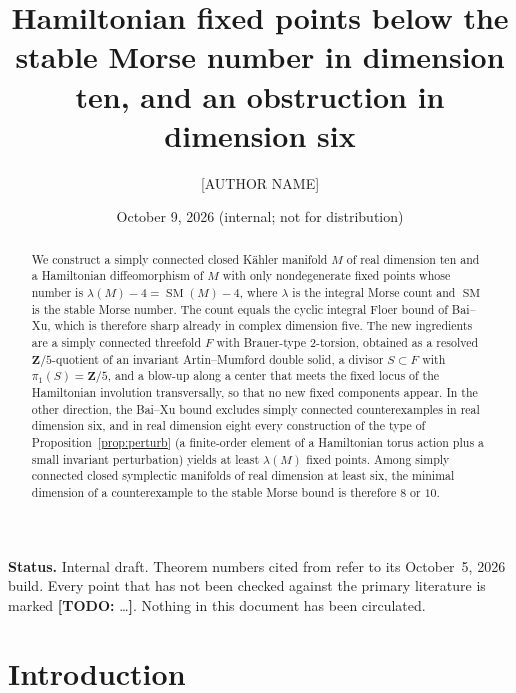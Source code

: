 \documentclass[11pt]{amsart}
\title[Fixed points below the stable Morse number in dimension ten]{Hamiltonian fixed points below the stable Morse number in dimension ten, and an obstruction in dimension six}
\author{[AUTHOR NAME]}
\date{October 9, 2026 (internal; not for distribution)}
\newcommand{\todo}[1]{{\color{red}\textbf{[TODO:} #1\textbf{]}}}
\numberwithin{equation}{section}
\theoremstyle{definition}
\theoremstyle{remark}
\newcommand{\Z}{\mathbf Z}
\DeclareMathOperator{\SM}{SM}
\begin{document}
\begin{abstract}
We construct a simply connected closed K\"ahler manifold $M$ of real
dimension ten and a Hamiltonian diffeomorphism of $M$ with only
nondegenerate fixed points whose number is $\lambda(M)-4=\SM(M)-4$, where
$\lambda$ is the integral Morse count and $\SM$ is the stable Morse number.
The count equals the cyclic integral Floer bound of Bai--Xu, which is
therefore sharp already in complex dimension five. The new ingredients are
a simply connected threefold $F$ with Brauer-type $2$-torsion, obtained as a
resolved $\Z/5$-quotient of an invariant Artin--Mumford double solid, a
divisor $S\subset F$ with $\pi_1(S)=\Z/5$, and a blow-up along a center
that meets the fixed locus of the Hamiltonian involution transversally, so
that no new fixed components appear. In the other direction, the Bai--Xu bound excludes simply connected
counterexamples in real dimension six, and in real dimension eight every
construction of the type of Proposition~\ref{prop:perturb} (a finite-order
element of a Hamiltonian torus action plus a small invariant perturbation)
yields at least $\lambda(M)$ fixed points. Among simply connected closed
symplectic manifolds of real dimension at least six, the minimal dimension
of a counterexample to the stable Morse bound is therefore $8$ or $10$.
\end{abstract}

\maketitle

\noindent\textbf{Status.} Internal draft. Theorem numbers cited from
\cite{OpenAI22} refer to its October~5, 2026 build. Every point that has
not been checked against the primary literature is marked \todo{\dots}.
Nothing in this document has been circulated.

\tableofcontents

\section{Introduction}\label{sec:intro}
\end{document}
